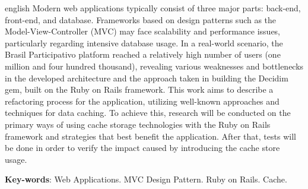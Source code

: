 \begin{resumo}[Abstract]
  \begin{otherlanguage*}{english}
   Modern web applications typically consist of three major parts: back-end, front-end, and database. Frameworks based on design patterns such as the Model-View-Controller (MVC) may face scalability and performance issues, particularly regarding intensive database usage. In a real-world scenario, the Brasil Participativo platform reached a relatively high number of users (one million and four hundred thousand), revealing various weaknesses and bottlenecks in the developed architecture and the approach taken in building the Decidim gem, built on the Ruby on Rails framework. This work aims to describe a refactoring process for the application, utilizing well-known approaches and techniques for data caching. To achieve this, research will be conducted on the primary ways of using cache storage technologies with the Ruby on Rails framework and strategies that best benefit the application. After that, tests will be done in order to verify the impact caused by introducing the cache store usage.

    \vspace{\onelineskip}

    \noindent
    \textbf{Key-words}: Web Applications. MVC Design Pattern. Ruby on Rails. Cache.
  \end{otherlanguage*}
 \end{resumo}
